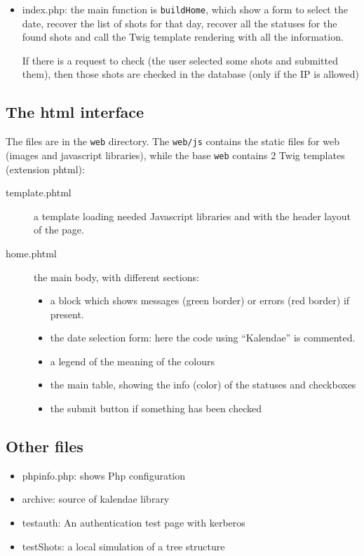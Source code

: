 \documentclass[12pt]{article}
\begin{document}
\begin{itemize}
\item index.php: the main function is \texttt{buildHome}, which show a form to select the date,
  recover the list of shots for that day, recover all the statuses for the found shots and
  call the Twig template rendering with all the information.

  If there is a request to check (the user selected some shots and submitted them), then
  those shots are checked in the database (only if the IP is allowed)
\end{itemize}


\subsection{The html interface}

The files are in the \texttt{web} directory. The \texttt{web/js}
contains the static files for web (images and javascript libraries), while
the base \texttt{web} contains 2 Twig templates (extension phtml):
\begin{description}
\item[template.phtml] a template loading needed Javascript libraries and
  with the header layout of the page.
\item[home.phtml] the main body, with  different sections:
\begin{itemize}
\item a block which shows messages (green border) or errors (red border) if present.
\item the date selection form: here the code using ``Kalendae'' is commented.
\item a legend of the meaning of the colours
\item the main table, showing the info (color) of the statuses and checkboxes
\item the submit button if something has been checked
\end{itemize}
\end{description}



\subsection{Other files}
\begin{itemize}
\item phpinfo.php: shows Php configuration
\item archive: source of kalendae library
\item testauth: An authentication test page with kerberos
\item testShots: a local simulation of a tree structure
\end{itemize}
\end{document}
